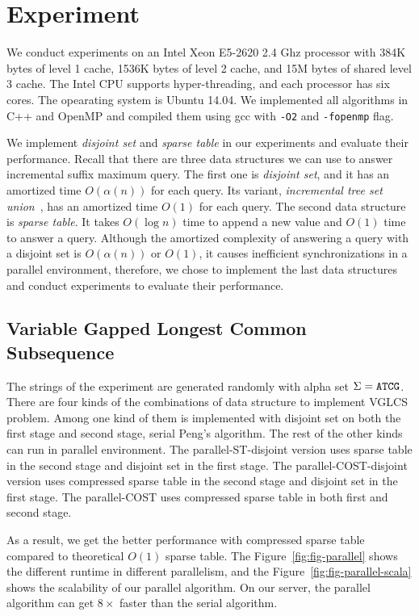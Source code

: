\section{Experiment}
\label{sec:Experiment}

We conduct experiments on an Intel Xeon E5-2620 2.4 Ghz processor with
384K bytes of level 1 cache, 1536K bytes of level 2 cache, and 15M
bytes of shared level 3 cache.  The Intel CPU supports
hyper-threading, and each processor has six cores.  The opearating
system is Ubuntu 14.04.  We implemented all algorithms in C++ and
OpenMP and compiled them using gcc with {\tt -O2} and {\tt -fopenmp}
flag.

We implement {\em disjoint set} and {\em sparse table} in our
experiments and evaluate their performance.  Recall that there are three
data structures we can use to answer incremental suffix maximum query.
The first one is {\em disjoint set}, and it has an amortized time
$O(\alpha(n))$ for each query.  Its variant, {\em incremental   tree set
union}~\cite{Gabow1983ALA}, has an amortized time $O(1)$ for each query.
The second data structure is {\em sparse table}.  It takes $O(\log n)$
time to append a new value and $O(1)$ time to answer a query.  Although
the amortized complexity of answering a query with a disjoint set is
$O(\alpha(n))$ or $O(1)$, it causes inefficient synchronizations in a
parallel environment, therefore, we chose to implement the last data
structures and conduct experiments to evaluate their performance.

\subsection{Variable Gapped Longest Common Subsequence}

The strings of the experiment are generated randomly with alpha set
$\Sigma={\tt ATCG}$.   There are four kinds of the combinations of data
structure to implement VGLCS problem.  Among one kind of them is
implemented with disjoint set on both the first stage and second stage,
serial Peng's algorithm.   The rest of the other kinds can run in
parallel environment.  The parallel-ST-disjoint version uses sparse
table in the second stage and disjoint set in the first stage. The
parallel-COST-disjoint version uses compressed sparse table in the
second stage and disjoint set in the first stage.  The parallel-COST
uses compressed sparse table in both first and second stage.

As a result, we get the better performance with compressed sparse table
compared to theoretical $O(1)$ sparse table.  The 
Figure~\ref{fig:fig-parallel} shows the different runtime in different 
parallelism, and the Figure~\ref{fig:fig-parallel-scala} shows the
scalability of our parallel algorithm.  On our server, the parallel
algorithm can get $8 \times$ faster than the serial algorithm.


